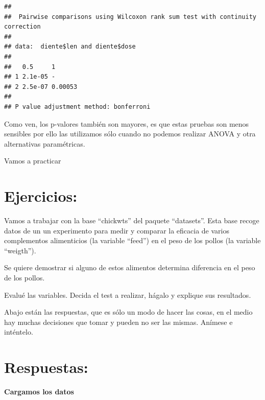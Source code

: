 \documentclass[
]{book}
\newenvironment{Shaded}{\begin{snugshade}}{\end{snugshade}}
\newcommand{\AttributeTok}[1]{\textcolor[rgb]{0.77,0.63,0.00}{#1}}
\newcommand{\FunctionTok}[1]{\textcolor[rgb]{0.00,0.00,0.00}{#1}}
\newcommand{\NormalTok}[1]{#1}
\newcommand{\SpecialCharTok}[1]{\textcolor[rgb]{0.00,0.00,0.00}{#1}}
\newcommand{\StringTok}[1]{\textcolor[rgb]{0.31,0.60,0.02}{#1}}
\begin{document}
\begin{Shaded}
\end{Shaded}

\begin{verbatim}
## 
##  Pairwise comparisons using Wilcoxon rank sum test with continuity correction 
## 
## data:  diente$len and diente$dose 
## 
##   0.5     1      
## 1 2.1e-05 -      
## 2 2.5e-07 0.00053
## 
## P value adjustment method: bonferroni
\end{verbatim}

Como ven, los p-valores también son mayores, es que estas pruebas son menos sensibles por ello las utilizamos sólo cuando no podemos realizar ANOVA y otra alternativas paramétricas.

Vamos a practicar

\hypertarget{ejercicios-7}{%
\section{\texorpdfstring{ Ejercicios:}{ Ejercicios:}}\label{ejercicios-7}}

Vamos a trabajar con la base ``chickwts'' del paquete ``datasets''. Esta base recoge datos de un un experimento para medir y comparar la eficacia de varios complementos alimenticios (la variable ``feed'') en el peso de los pollos (la variable ``weigth'').

Se quiere demostrar si alguno de estos alimentos determina diferencia en el peso de los pollos.

Evalué las variables. Decida el test a realizar, hágalo y explique sus resultados.

Abajo están las respuestas, que es sólo un modo de hacer las cosas, en el medio hay muchas decisiones que tomar y pueden no ser las mismas. Anímese e inténtelo.

\hypertarget{respuestas-5}{%
\section{\texorpdfstring{ Respuestas:}{ Respuestas:}}\label{respuestas-5}}

\textbf{Cargamos los datos}
\end{document}
